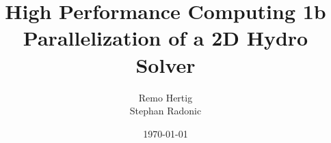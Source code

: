 \documentclass{beamer}
\title[HPC 1b]{High Performance Computing 1b \\
Parallelization of a 2D Hydro Solver} %
\author[Hertig, Radonic]{Remo Hertig\\
Stephan Radonic} %
\institute[UZH] %
{
\ %
}
\date{\today} %
\begin{document}
\begin{frame}
\titlepage %
\end{frame}


\end{document}
